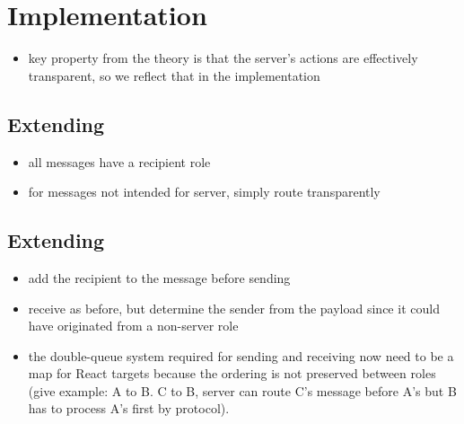 \chapter{Implementation}
\label{chap:impl}

\begin{itemize}
\item key property from the theory is that the server's actions are effectively transparent, so we reflect that in the implementation
\end{itemize}

\section{Extending }
\begin{itemize}
\item all messages have a recipient role
\item for messages not intended for server, simply route transparently
\end{itemize}

\section{Extending }
\begin{itemize}
\item add the recipient to the message before sending
\item receive as before, but determine the sender from the payload since it could have originated from a non-server role
\item the double-queue system required for sending and receiving now need to be a map for React targets because the ordering is not preserved between roles (give example: A to B. C to B, server can route C's message before A's but B has to process A's first by protocol).
\end{itemize}